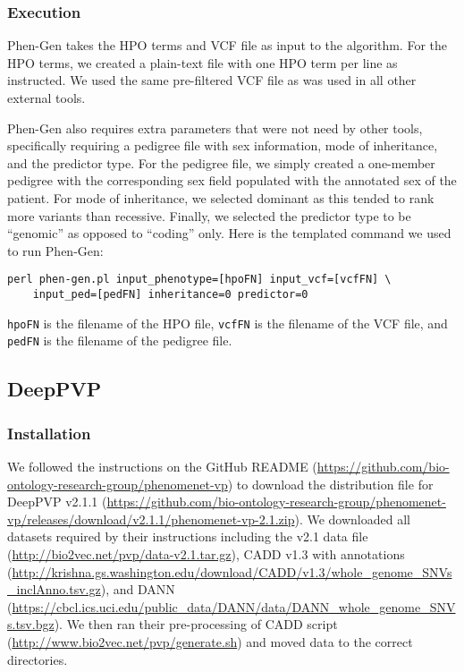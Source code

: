 \documentclass{article}
\begin{document}
\subsubsection{Execution}
Phen-Gen takes the HPO terms and VCF file as input to the algorithm.  For the HPO terms, we created a plain-text file with one HPO term per line as instructed.  We used the same pre-filtered VCF file as was used in all other external tools.  

Phen-Gen also requires extra parameters that were not need by other tools, specifically requiring a pedigree file with sex information, mode of inheritance, and the predictor type.  For the pedigree file, we simply created a one-member pedigree with the corresponding sex field populated with the annotated sex of the patient.  For mode of inheritance, we selected dominant as this tended to rank more variants than recessive.  Finally, we selected the predictor type to be ``genomic'' as opposed to ``coding'' only.  Here is the templated command we used to run Phen-Gen:

\begin{verbatim}
perl phen-gen.pl input_phenotype=[hpoFN] input_vcf=[vcfFN] \
    input_ped=[pedFN] inheritance=0 predictor=0
\end{verbatim}

\texttt{hpoFN} is the filename of the HPO file, \texttt{vcfFN} is the filename of the VCF file, and \texttt{pedFN} is the filename of the pedigree file.

\subsection{DeepPVP}
\subsubsection{Installation}
We followed the instructions on the GitHub README (\url{https://github.com/bio-ontology-research-group/phenomenet-vp}) to download the distribution file for DeepPVP v2.1.1 (\url{https://github.com/bio-ontology-research-group/phenomenet-vp/releases/download/v2.1.1/phenomenet-vp-2.1.zip}).  We downloaded all datasets required by their instructions including the v2.1 data file (\url{http://bio2vec.net/pvp/data-v2.1.tar.gz}), CADD v1.3 with annotations (\url{http://krishna.gs.washington.edu/download/CADD/v1.3/whole_genome_SNVs_inclAnno.tsv.gz}), and DANN (\url{https://cbcl.ics.uci.edu/public_data/DANN/data/DANN_whole_genome_SNVs.tsv.bgz}).  We then ran their pre-processing of CADD script (\url{http://www.bio2vec.net/pvp/generate.sh}) and moved data to the correct directories.
\end{document}
